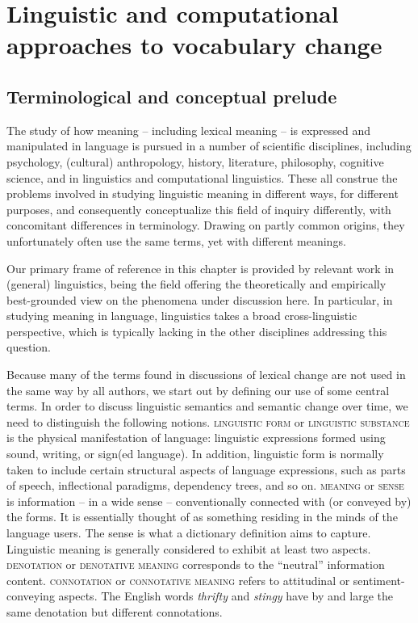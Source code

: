 \documentclass[output=paper]{langsci/langscibook}
\begin{document}
\section{Linguistic and computational approaches to vocabulary change}\label{sec:lingappr}
\subsection{Terminological and conceptual prelude}\label{sec:lingterms}
The study of how meaning -- including lexical meaning -- is
expressed and manipulated in language is pursued in a number of
scientific disciplines, including psychology, (cultural) anthropology,
history, literature, philosophy, cognitive science, and in linguistics
and computational linguistics. These all construe the problems
involved in studying linguistic meaning in different ways, for
different purposes, and consequently conceptualize this field of
inquiry differently, with concomitant differences in
terminology. Drawing on partly common origins, they unfortunately
often use the same terms, yet with different meanings.

Our primary frame of reference in this chapter is provided
by relevant work in (general) linguistics, being the field offering
the theoretically and empirically best-grounded view on the phenomena
under discussion here. In particular, in studying meaning in language,
linguistics takes a broad cross-linguistic perspective, which is typically
lacking in the other disciplines addressing this question.

Because many of the terms found in discussions of lexical change are not used in the same way by all authors, we start out by defining our use of some central terms. In order to discuss linguistic
semantics and semantic change over time, we need to distinguish the following notions. \textsc{linguistic form} or
\textsc{linguistic substance} is the physical manifestation of language:
linguistic expressions formed using sound, writing, or sign(ed
language). In addition, linguistic form is normally taken to include certain
structural aspects of language expressions, such as parts of speech,
inflectional paradigms, dependency trees, and so on. \textsc{meaning} or
\textsc{sense} is information -- in a wide sense -- conventionally connected with (or conveyed
by) the forms. It is essentially thought of as something residing in
the minds of the language users. The sense is what a dictionary
definition aims to capture. Linguistic meaning is generally considered
to exhibit at least two aspects. \textsc{denotation} or \textsc{denotative
  meaning} corresponds to the ``neutral'' information content. 
\textsc{connotation} or \textsc{connotative meaning} refers to attitudinal
or sentiment-conveying aspects. The English words \emph{thrifty} and
\emph{stingy} have by and large the same denotation but different
connotations.
\end{document}
